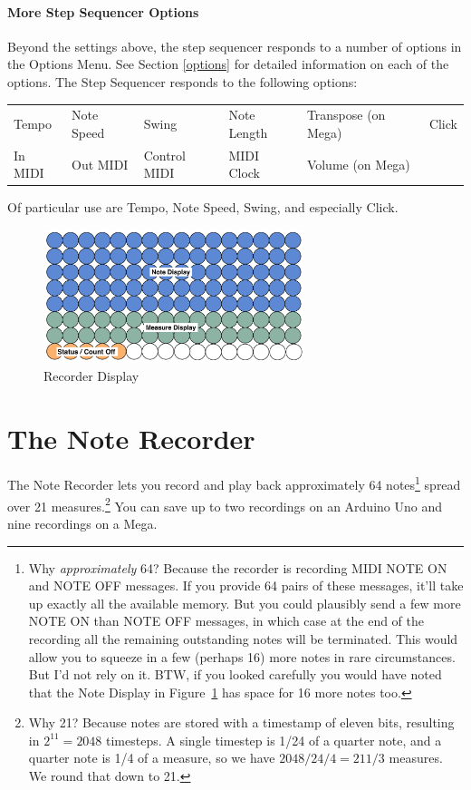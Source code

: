 \documentclass{article}
\begin{document}
\paragraph{More Step Sequencer Options}

Beyond the settings above, the step sequencer responds to a number of options in the Options Menu.  See Section \ref{options} for detailed information on each of the options.  The Step Sequencer responds to the following options:


\vspace{1em}
\begin{tabular}{llllll}
Tempo& Note Speed& Swing & Note Length&Transpose (on Mega)&Click\\
In MIDI& Out MIDI&Control MIDI&MIDI Clock&Volume (on Mega)\\
\end{tabular}

\vspace{1em}
Of particular use are Tempo, Note Speed, Swing, and especially Click.


\begin{figure}
\vspace{-3em}\includegraphics[width=3in]{recorder.pdf}
\vspace{-2em}\caption{\small Recorder Display}\vspace{-1em}
\label{recorder}
\end{figure}

\section {The Note Recorder}

The Note Recorder lets you record and play back approximately 64 notes\footnote{Why {\it approximately} 64? Because the recorder is recording MIDI NOTE ON and NOTE OFF messages.  If you provide 64 pairs of these messages, it'll take up exactly all the available memory.  But you could plausibly send a few more NOTE ON than NOTE OFF messages, in which case at the end of the recording all the remaining outstanding notes will be terminated.  This would allow you to squeeze in a few (perhaps 16) more notes in rare circumstances.  But I'd not rely on it.  BTW, if you looked carefully you would have noted that the Note Display in Figure~\ref{recorder} has space for 16 more notes too.} spread over 21 measures.\footnote{Why 21?  Because notes are stored with a timestamp of eleven bits, resulting in \(2^11 = 2048\) timesteps.  A single timestep is 1/24 of a quarter note, and a quarter note is 1/4 of a measure, so we have \(2048 / 24 / 4 = 21 1/3\) measures.  We round that down to 21.}  You can save up to two recordings on an Arduino Uno and nine recordings on a Mega.
\end{document}
